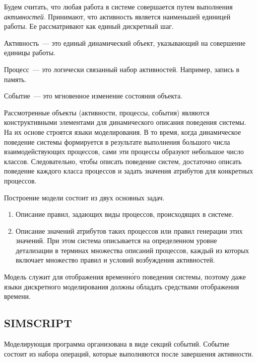 Будем считать, что любая работа в системе совершается путем выполнения \textit{активностей}. Принимают, что активность является наименьшей единицей работы. Ее рассматривают как единый дискретный шаг.

\begin{dd}
    Активность~--- это единый динамический объект, указывающий на совершение единицы работы.
\end{dd}

\begin{dd}
    Процесс~--- это логически связанный набор активностей. Например, запись в память.
\end{dd}

\begin{dd}
    Событие~--- это мгновенное изменение состояния объекта.
\end{dd}

Рассмотренные объекты (активности, процессы, события) являются конструктивными элементами для динамического описания поведения системы. На их основе строятся языки моделирования. В то время, когда динамическое поведение системы формируется в результате выполнения большого числа взаимодействующих процессов, сами эти процессы образуют небольшое число классов. Следовательно, чтобы описать поведение систем, достаточно описать поведение каждого класса процессов и задать значения атрибутов для конкретных процессов.

Построение модели состоит из двух основных задач.

\begin{enumerate}
    \item Описание правил, задающих виды процессов, происходящих в системе.
    \item Описание значений атрибутов таких процессов или правил генерации этих значений. При этом система описывается на определенном уровне детализации в терминах множества описаний процессов, каждый из которых включает множество правил и условий возбуждения активностей.
\end{enumerate}

Модель служит для отображения временн\'{о}го поведения системы, поэтому даже языки дискретного моделирования должны обладать средствами отображения времени.

\subsection{SIMSCRIPT}

Моделирующая программа организована в виде секций событий. Событие состоит из набора операций, которые выполняются после завершения активности.

